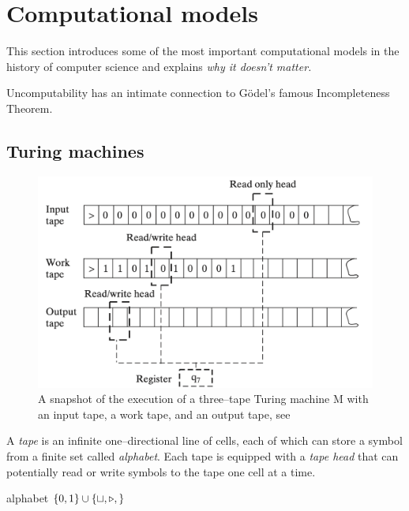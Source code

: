 \section{Computational models}


This section introduces some of the most important computational models in the history of computer science and explains \textit{why it doesn't matter.}



Uncomputability has an intimate connection to G\"{o}del's famous Incompleteness Theorem.



\subsection{Turing machines}


\begin{figure}[h]
    \centering
    \includegraphics[width=.9\textwidth]{fig/three-tape-TM}
    \caption{A snapshot of the execution of a three--tape Turing machine M with an input tape, a work tape, and an output tape, see \cite[p.~11]{Aro.Bar2009}}
    \label{fig: three-tape-TM}
\end{figure}




A \textit{tape} is an infinite one--directional line of cells, each of which can store a symbol from a finite  set called \textit{alphabet}.
% 
Each tape is equipped with a \textit{tape head} that can potentially read or write symbols to the tape one cell at a time.



alphabet $\{0,1\} \cup \{\sqcup, \triangleright, \}$



